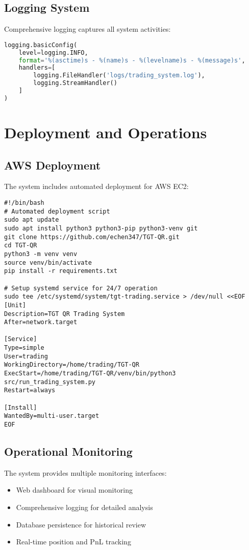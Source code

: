 \documentclass[12pt,a4paper]{article}
\begin{document}
\subsection{Logging System}
Comprehensive logging captures all system activities:

\begin{lstlisting}[language=Python, caption=Logging Configuration]
logging.basicConfig(
    level=logging.INFO,
    format='%(asctime)s - %(name)s - %(levelname)s - %(message)s',
    handlers=[
        logging.FileHandler('logs/trading_system.log'),
        logging.StreamHandler()
    ]
)
\end{lstlisting}

\section{Deployment and Operations}

\subsection{AWS Deployment}
The system includes automated deployment for AWS EC2:

\begin{lstlisting}[bash, caption=AWS Deployment Script]
#!/bin/bash
# Automated deployment script
sudo apt update
sudo apt install python3 python3-pip python3-venv git
git clone https://github.com/echen347/TGT-QR.git
cd TGT-QR
python3 -m venv venv
source venv/bin/activate
pip install -r requirements.txt

# Setup systemd service for 24/7 operation
sudo tee /etc/systemd/system/tgt-trading.service > /dev/null <<EOF
[Unit]
Description=TGT QR Trading System
After=network.target

[Service]
Type=simple
User=trading
WorkingDirectory=/home/trading/TGT-QR
ExecStart=/home/trading/TGT-QR/venv/bin/python3 src/run_trading_system.py
Restart=always

[Install]
WantedBy=multi-user.target
EOF
\end{lstlisting}

\subsection{Operational Monitoring}
The system provides multiple monitoring interfaces:

\begin{itemize}
\item Web dashboard for visual monitoring
\item Comprehensive logging for detailed analysis
\item Database persistence for historical review
\item Real-time position and PnL tracking
\end{itemize}
\end{document}
